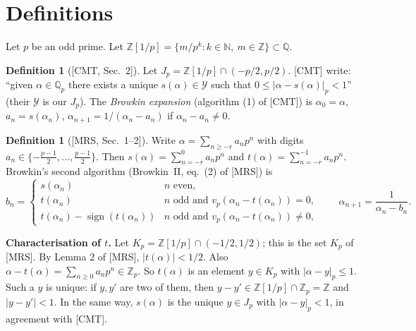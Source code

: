 \documentclass[11pt]{article}
\theoremstyle{definition}
\newtheorem{definition}[theorem]{Definition}
\newcommand{\Q}{\mathbb{Q}}
\newcommand{\Z}{\mathbb{Z}}
\begin{document}
\section{Definitions}

Let $p$ be an odd prime. Let $\Z[1/p]=\{m/p^k : k\in\mathbb{N},\ m\in\Z\}\subset\Q$.

\begin{definition}[{[CMT, Sec.~2]}]\label{def:s}
Let $J_p=\Z[1/p]\cap(-p/2,p/2)$. [CMT] write: ``given $\alpha\in\Q_p$ there exists a unique
$s(\alpha)\in\mathcal{Y}$ such that $0\le|\alpha-s(\alpha)|_p<1$'' (their $\mathcal Y$ is our $J_p$). The
\emph{Browkin expansion} (algorithm (1) of [CMT]) is
$\alpha_0=\alpha$, $a_n=s(\alpha_n)$, $\alpha_{n+1}=1/(\alpha_n-a_n)$ if $\alpha_n-a_n\ne0$.
\end{definition}

\begin{definition}[{[MRS, Sec.~1--2]}]\label{def:t}
Write $\alpha=\sum_{n\ge -r}a_np^n$ with digits $a_n\in\{-\frac{p-1}2,\dots,\frac{p-1}2\}$. Then
$s(\alpha)=\sum_{n=-r}^{0}a_np^n$ and $t(\alpha)=\sum_{n=-r}^{-1}a_np^n$. Browkin's second algorithm
(Browkin~II, eq.~(2) of [MRS]) is
\[
b_n=\begin{cases} s(\alpha_n) & n\text{ even},\\
t(\alpha_n) & n\text{ odd and } v_p(\alpha_n-t(\alpha_n))=0,\\
t(\alpha_n)-\operatorname{sign}(t(\alpha_n)) & n\text{ odd and } v_p(\alpha_n-t(\alpha_n))\ne0,
\end{cases}
\qquad \alpha_{n+1}=\frac1{\alpha_n-b_n}.
\]
\end{definition}

\textbf{Characterisation of $t$.} Let $K_p=\Z[1/p]\cap(-1/2,1/2)$; this is the set $K_p$ of [MRS].
By Lemma 2 of [MRS], $|t(\alpha)|<1/2$. Also $\alpha-t(\alpha)=\sum_{n\ge0}a_np^n\in\Z_p$. So $t(\alpha)$ is an
element $y\in K_p$ with $|\alpha-y|_p\le1$. Such a $y$ is unique: if $y,y'$ are two of them, then
$y-y'\in\Z[1/p]\cap\Z_p=\Z$ and $|y-y'|<1$. In the same way, $s(\alpha)$ is the unique $y\in J_p$ with
$|\alpha-y|_p<1$, in agreement with [CMT].
\end{document}

